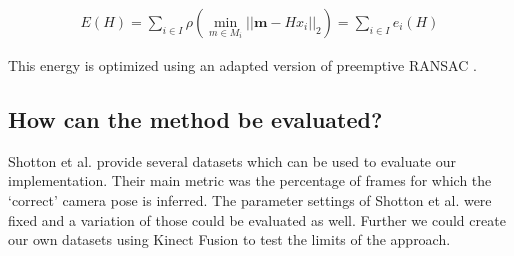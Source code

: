 \begin{eqnarray}
  E(H) = \sum_{i \in \mathit{I}}{\rho (\min_{m \in \mathit{M}_i}||\mathbf{m} -Hx_i||_2)} = \sum_{i \in \mathit{I}}{e_i(H)}
\end{eqnarray}

This energy is optimized using an adapted version of preemptive RANSAC \cite{ransac}.



\subsection{How can the method be evaluated?} %
\label{sub:how_can_the_method_be_evaluated_}

Shotton et al. \cite{shotton} provide several datasets which can be used to evaluate our implementation. Their main metric was the percentage of frames for which the `correct' camera pose is inferred. The parameter settings of Shotton et al. were fixed and a variation of those could be evaluated as well. Further we could create our own datasets using Kinect Fusion \cite{izadi_fusion} \cite{newcombe_fusion} to test the limits of the approach.





\clearpage
\renewcommand{\leftmark}{}




%





